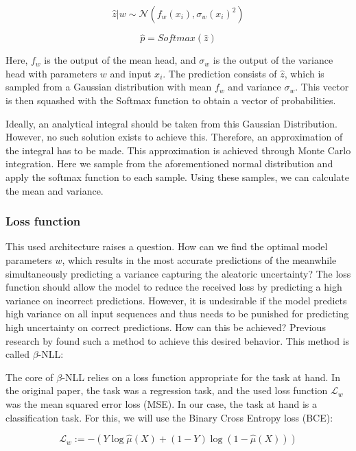 \begin{equation}
    \hat{z}|w \sim \mathcal{N}(f_w(x_i), \sigma_w(x_i)^2)
\end{equation}

\begin{equation}
    \hat{p} = Softmax(\hat{z})
\end{equation}

Here, $f_w$ is the output of the mean head, and $\sigma_w$ is the output of the variance head with parameters $w$ and input $x_i$. The prediction consists of $\hat{z}$, which is sampled from a Gaussian distribution with mean $f_w$ and variance $\sigma_w$. This vector is then squashed with the Softmax function to obtain a vector of probabilities.

Ideally, an analytical integral should be taken from this Gaussian Distribution. However, no such solution exists to achieve this. Therefore, an approximation of the integral has to be made. This approximation is achieved through Monte Carlo integration. Here we sample from the aforementioned normal distribution and apply the softmax function to each sample. Using these samples, we can calculate the mean and variance.

\subsubsection{Loss function}


This used architecture raises a question. How can we find the optimal model parameters $w$, which results in the most accurate predictions of the meanwhile simultaneously predicting a variance capturing the aleatoric uncertainty? The loss function should allow the model to reduce the received loss by predicting a high variance on incorrect predictions. However, it is undesirable if the model predicts high variance on all input sequences and thus needs to be punished for predicting high uncertainty on correct predictions. How can this be achieved? Previous research by \cite{seitzer2022pitfalls} found such a method to achieve this desired behavior. This method is called $\beta$-NLL:

The core of $\beta$-NLL relies on a loss function appropriate for the task at hand. In the original paper, the task was a regression task, and the used loss function $\mathcal{L}_w$ was the mean squared error loss (MSE). In our case, the task at hand is a classification task. For this, we will use the Binary Cross Entropy loss (BCE):

\begin{equation}
    \mathcal{L}_w := - ( Y \log \hat{\mu}(X) + (1 - Y) \log (1 - \hat{\mu}(X)) )
\end{equation}

